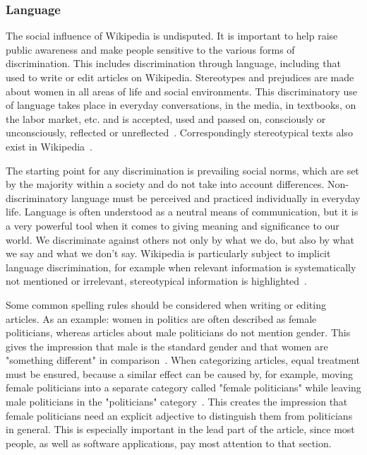 \documentclass[a4paper, 11pt]{article}
\begin{document}
\subsubsection{Language} \label{sec:gender-gap-wikipedia:language}
The social influence of Wikipedia is undisputed. It is important to help raise public awareness and make people sensitive to the various forms of discrimination. This includes discrimination through language, including that used to write or edit articles on Wikipedia. Stereotypes and prejudices are made about women in all areas of life and social environments. This discriminatory use of language takes place in everyday conversations, in the media, in textbooks, on the labor market, etc. and is accepted, used and passed on, consciously or unconsciously, reflected or unreflected~\cite{peters2017bbc}. Correspondingly stereotypical texts also exist in Wikipedia~\cite{graells2015first}.

The starting point for any discrimination is prevailing social norms, which are set by the majority within a society and do not take into account differences. Non-discriminatory language must be perceived and practiced individually in everyday life. Language is often understood as a neutral means of communication, but it is a very powerful tool when it comes to giving meaning and significance to our world. We discriminate against others not only by what we do, but also by what we say and what we don't say. Wikipedia is particularly subject to implicit language discrimination, for example when relevant information is systematically not mentioned or irrelevant, stereotypical information is highlighted~\cite{wagner2016women}.

Some common spelling rules should be considered when writing or editing articles. As an example: women in politics are often described as female politicians, whereas articles about male politicians do not mention gender. This gives the impression that male is the standard gender and that women are "something different" in comparison~\cite{wagner2016women}. When categorizing articles, equal treatment must be ensured, because a similar effect can be caused by, for example, moving female politicians into a separate category called "female politicians" while leaving male politicians in the "politicians" category~\cite{flood2013guardian}. This creates the impression that female politicians need an explicit adjective to distinguish them from politicians in general. This is especially important in the lead part of the article, since most people, as well as software applications, pay most attention to that section.
\end{document}
